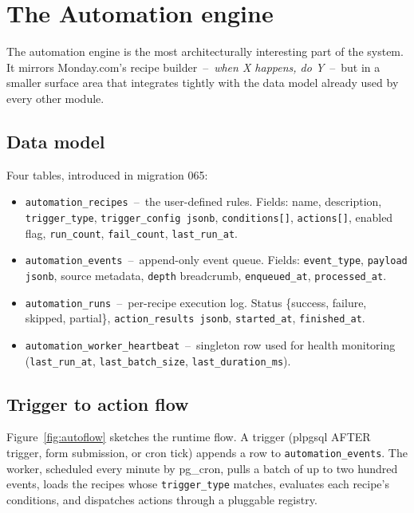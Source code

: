\documentclass[11pt,a4paper,oneside]{article}
\newcommand{\code}[1]{\texttt{\small #1}}
\newcommand{\dash}{\,--\,}
\begin{document}
\section{The Automation engine}\label{sec:automation}

The automation engine is the most architecturally interesting part
of the system. It mirrors Monday.com's recipe builder \dash{}
\emph{when X happens, do Y} \dash{} but in a smaller surface area
that integrates tightly with the data model already used by every
other module.

\subsection{Data model}

Four tables, introduced in migration 065:

\begin{itemize}
  \item \code{automation\_recipes} \dash{} the user-defined rules.
    Fields: name, description, \code{trigger\_type},
    \code{trigger\_config jsonb}, \code{conditions[]}, \code{actions[]},
    enabled flag, \code{run\_count}, \code{fail\_count},
    \code{last\_run\_at}.
  \item \code{automation\_events} \dash{} append-only event queue.
    Fields: \code{event\_type}, \code{payload jsonb}, source
    metadata, \code{depth} breadcrumb, \code{enqueued\_at},
    \code{processed\_at}.
  \item \code{automation\_runs} \dash{} per-recipe execution log.
    Status \{success, failure, skipped, partial\},
    \code{action\_results jsonb}, \code{started\_at},
    \code{finished\_at}.
  \item \code{automation\_worker\_heartbeat} \dash{} singleton row
    used for health monitoring (\code{last\_run\_at},
    \code{last\_batch\_size}, \code{last\_duration\_ms}).
\end{itemize}

\subsection{Trigger to action flow}

Figure~\ref{fig:autoflow} sketches the runtime flow. A trigger
(plpgsql AFTER trigger, form submission, or cron tick) appends a
row to \code{automation\_events}. The worker, scheduled every
minute by pg\_cron, pulls a batch of up to two hundred events,
loads the recipes whose \code{trigger\_type} matches, evaluates
each recipe's conditions, and dispatches actions through a pluggable
registry.
\end{document}

